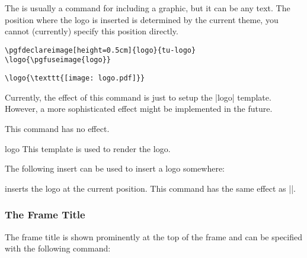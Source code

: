 \begin{command}{\logo{}}
  The  is usually a command for including a graphic,
  but it can be any text. The position where the logo is inserted is
  determined by the current theme, you cannot (currently) specify this
  position directly.
  
  \example
\begin{verbatim}
\pgfdeclareimage[height=0.5cm]{logo}{tu-logo}
\logo{\pgfuseimage{logo}}
\end{verbatim}

  \example
\begin{verbatim}
\logo{\texttt{[image: logo.pdf]}}
\end{verbatim}

  Currently, the effect of this command is just to setup the |logo|
  template. However, a more sophisticated effect might be implemented
  in the future.
  
  \articlenote This command has no effect.

  \begin{element}{logo}\yes\yes\yes
    This template is used to render the logo.
  \end{element}

  The following insert can be used to insert a logo somewhere:
  \begin{itemize}
    \iteminsert{\insertlogo}
    inserts the logo at the current position. This command has the
    same effect as ||.
  \end{itemize}
\end{command}


\subsubsection{The Frame Title}

The frame title is shown prominently at the top of the frame and can
be specified with the following command:

